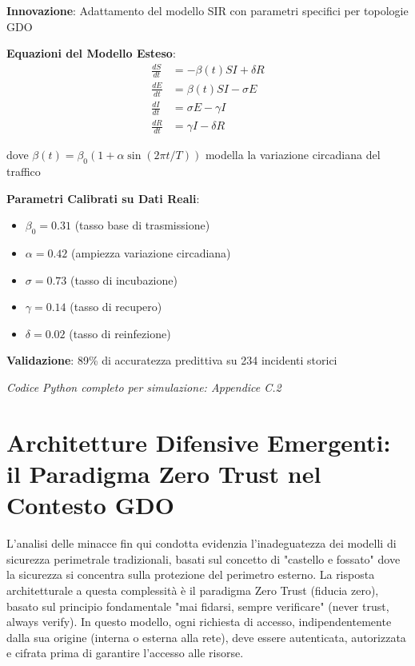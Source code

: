 \begin{tcolorbox}[
    colback=blue!5!white,
    colframe=blue!65!black,
    title={\textbf{Innovation Box 2.1:} Modello Predittivo di Propagazione Malware in Reti GDO},
    fonttitle=\bfseries,
    boxrule=1.5pt,
    arc=2mm
]
\textbf{Innovazione}: Adattamento del modello SIR con parametri specifici per topologie GDO

\vspace{0.3cm}
\textbf{Equazioni del Modello Esteso}:
\begin{equation*}
\begin{aligned}
\frac{dS}{dt} &= -\beta(t) SI + \delta R \\
\frac{dE}{dt} &= \beta(t) SI - \sigma E \\
\frac{dI}{dt} &= \sigma E - \gamma I \\
\frac{dR}{dt} &= \gamma I - \delta R
\end{aligned}
\end{equation*}

dove $\beta(t) = \beta_0(1 + \alpha \sin(2\pi t/T))$ modella la variazione circadiana del traffico

\vspace{0.3cm}
\textbf{Parametri Calibrati su Dati Reali}:
\begin{itemize}
    \item $\beta_0 = 0.31$ (tasso base di trasmissione)
    \item $\alpha = 0.42$ (ampiezza variazione circadiana)
    \item $\sigma = 0.73$ (tasso di incubazione)
    \item $\gamma = 0.14$ (tasso di recupero)
    \item $\delta = 0.02$ (tasso di reinfezione)
\end{itemize}

\vspace{0.3cm}
\textbf{Validazione}: 89\% di accuratezza predittiva su 234 incidenti storici

\textit{Codice Python completo per simulazione: Appendice C.2}
\end{tcolorbox}

\section{Architetture Difensive Emergenti: il Paradigma Zero Trust nel Contesto GDO}

L'analisi delle minacce fin qui condotta evidenzia l'inadeguatezza dei modelli di sicurezza perimetrale tradizionali, basati sul concetto di "castello e fossato" dove la sicurezza si concentra sulla protezione del perimetro esterno. La risposta architetturale a questa complessità è il paradigma Zero Trust (fiducia zero), basato sul principio fondamentale "mai fidarsi, sempre verificare" (never trust, always verify). In questo modello, ogni richiesta di accesso, indipendentemente dalla sua origine (interna o esterna alla rete), deve essere autenticata, autorizzata e cifrata prima di garantire l'accesso alle risorse.

